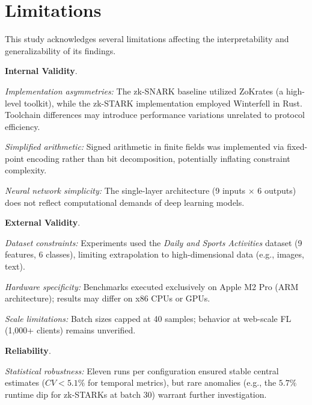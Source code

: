 \documentclass[runningheads]{llncs}
\begin{document}
\section{Limitations}




This study acknowledges several limitations affecting the interpretability and generalizability of its findings.

{\bf Internal Validity}.

{\em Implementation asymmetries:} The zk-SNARK baseline utilized ZoKrates (a high-level toolkit), while the zk-STARK implementation employed Winterfell in Rust. Toolchain differences may introduce performance variations unrelated to protocol efficiency.

{\em Simplified arithmetic:} Signed arithmetic in finite fields was implemented via fixed-point encoding rather than bit decomposition, potentially inflating constraint complexity.

{\em Neural network simplicity:} The single-layer architecture (9 inputs $\times$ 6 outputs) does not reflect computational demands of deep learning models.

{\bf External Validity}.

{\em Dataset constraints:} Experiments used the {\em Daily and Sports Activities} dataset (9 features, 6 classes), limiting extrapolation to high-dimensional data (e.g., images, text).

{\em Hardware specificity:} Benchmarks executed exclusively on Apple M2 Pro (ARM architecture); results may differ on x86 CPUs or GPUs.

{\em Scale limitations:} Batch sizes capped at 40 samples; behavior at web-scale FL (1,000+ clients) remains unverified.

{\bf Reliability}.

{\em Statistical robustness:} Eleven runs per configuration ensured stable central estimates ($CV < 5.1\%$ for temporal metrics), but rare anomalies (e.g., the $5.7\%$ runtime dip for zk-STARKs at batch 30) warrant further investigation.
\end{document}
